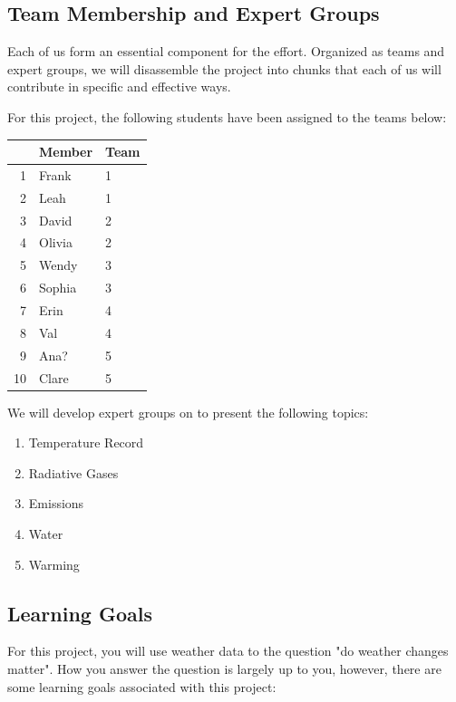 \documentclass{article}\usepackage[]{graphicx}\usepackage[]{color}
\begin{document}
\subsection{Team Membership and Expert Groups}

Each of us form an essential component for the effort. Organized as teams and expert groups, we will disassemble the project into chunks that each of us will contribute in specific and effective ways.

For this project, the following students have been assigned to the teams below:

\begin{table}[ht]
\centering
\begin{tabular}{rll}
  \hline
 & Member & Team \\ 
  \hline
1 & Frank & 1 \\ 
  2 & Leah & 1 \\ 
  3 & David & 2 \\ 
  4 & Olivia & 2 \\ 
  5 & Wendy & 3 \\ 
  6 & Sophia & 3 \\ 
  7 & Erin & 4 \\ 
  8 & Val & 4 \\ 
  9 & Ana? & 5 \\ 
  10 & Clare & 5 \\ 
   \hline
\end{tabular}
\end{table}


We will develop expert groups on to present the following topics:

\begin{enumerate}
  \item Temperature Record
  \item Radiative Gases
  \item Emissions 
  \item Water
  \item Warming 
\end{enumerate}


\subsection{Learning Goals}

For this project, you will use weather data to the question "do weather changes matter". How you answer the question is largely up to you, however, there are some learning goals associated with this project:
\end{document}
